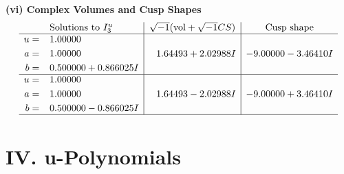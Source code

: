 \documentclass[1p]{elsarticle_modified}
\theoremstyle{definition}
\newcommand{\I}{\sqrt{-1}}
\begin{document}
\newpage\flushleft \textbf{(vi) Complex Volumes and Cusp Shapes}
$$\begin{array}{c|c|c}  
\text{Solutions to }I^u_{3}& \I (\text{vol} + \sqrt{-1}CS) & \text{Cusp shape}\\
 \hline 
\begin{aligned}
u &= \phantom{-}1.00000\phantom{ +0.000000I} \\
a &= \phantom{-}1.00000\phantom{ +0.000000I} \\
b &= \phantom{-}0.500000 + 0.866025 I\end{aligned}
 & \phantom{-}1.64493 + 2.02988 I & -9.00000 - 3.46410 I \\ \hline\begin{aligned}
u &= \phantom{-}1.00000\phantom{ +0.000000I} \\
a &= \phantom{-}1.00000\phantom{ +0.000000I} \\
b &= \phantom{-}0.500000 - 0.866025 I\end{aligned}
 & \phantom{-}1.64493 - 2.02988 I & -9.00000 + 3.46410 I\\
 \hline 
 \end{array}$$\newpage
\newpage\renewcommand{\arraystretch}{1}
\centering \section*{ IV. u-Polynomials}
\end{document}

